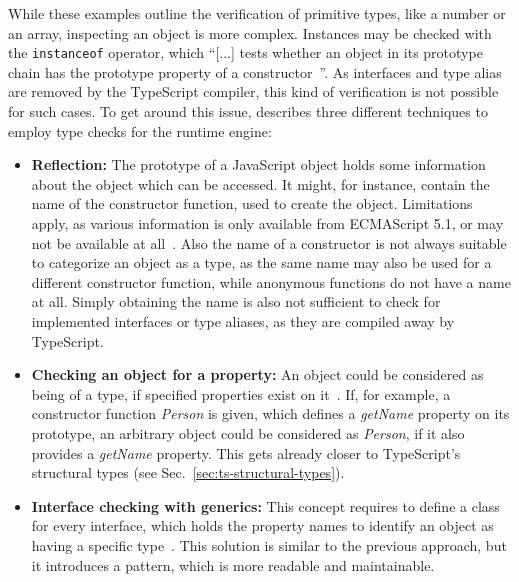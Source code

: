 While these examples outline the verification of primitive types, like a number or an array, inspecting an object is more complex. Instances may be checked with the \texttt{instanceof} operator, which ``[...] tests whether an object in its prototype chain has the prototype property of a constructor~\cite{instanceof:MDN:2017}''. As interfaces and type alias are removed by the TypeScript compiler, this kind of verification is not possible for such cases. To get around this issue, \citeauthor{MasteringTypeScript:Rozentals:2015} describes three different techniques to employ type checks for the runtime engine:
\begin{itemize}
  \item \textbf{Reflection:} The prototype of a JavaScript object holds 
some information about the object which can be accessed. It might, for instance, contain the name of the constructor function, used to create the object. Limitations apply, as various information is only available from ECMAScript 5.1, or may not be available at all~\cite[pp.~98--100]{MasteringTypeScript:Rozentals:2015}. Also the name of a constructor is not always suitable to categorize an object as a type, as the same name may also be used for a different constructor function, while anonymous functions do not have a name at all. Simply obtaining the name is also not sufficient to check for implemented interfaces or type aliases, as they are compiled away by TypeScript.
  \item \textbf{Checking an object for a property:} An object could be considered 
as being of a type, if specified properties exist on it~\cites[pp.~101--102]{MasteringTypeScript:Rozentals:2015}[pp.~18--20]{ProJavaScriptDesignPatterns:HarmesDiaz:2008}. If, for example, a constructor function \emph{Person} is given, which defines a \emph{getName} property on its prototype, an arbitrary object could be considered as \emph{Person}, if it also provides a \emph{getName} property. This gets already closer to TypeScript's structural types (see Sec.~\ref{sec:ts-structural-types}).
  \item \textbf{Interface checking with generics:} This concept requires to define a class for every interface, which holds the property names to identify an object as having a specific type~\cites[pp.~102--105]{MasteringTypeScript:Rozentals:2015}[pp.~17--19]{ProJavaScriptDesignPatterns:HarmesDiaz:2008}. This solution is similar to the previous approach, but it introduces a pattern, which is more readable and maintainable.
\end{itemize}
